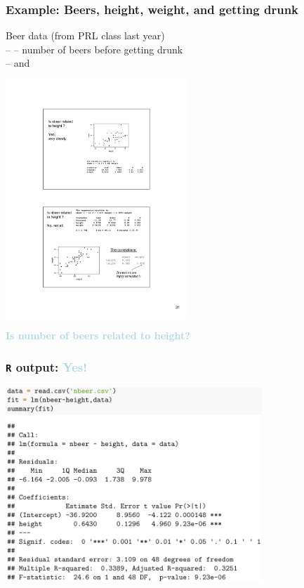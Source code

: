 \documentclass{beamer}
\newcommand{\lb}[1]{\textcolor{lightblue}{#1}}
\newcommand{\sk}{\vspace{.5cm}}
\begin{document}
\begin{frame}
	\frametitle{Example: Beers, height, weight, and getting drunk}

\sk
Beer data (from PRL class last year) \\
-- {\color{burntorange}{\bf nbeer}} -- number of beers before getting drunk \\
-- {\color{burntorange}{\bf height}} and {\color{burntorange}{\bf  weight}} 
	
	
\hspace*{15mm}\includegraphics[width=2.7in]{figures/beer1}
	
\lb{\bf Is number of beers related to height?}
	
\end{frame}


\begin{frame}
	\frametitle{{\tt R} output: \lb{Yes!}}
	
\hspace*{2mm}\includegraphics[width=3.8in]{figures/beersMLR1}
	
\end{frame}
\end{document}
